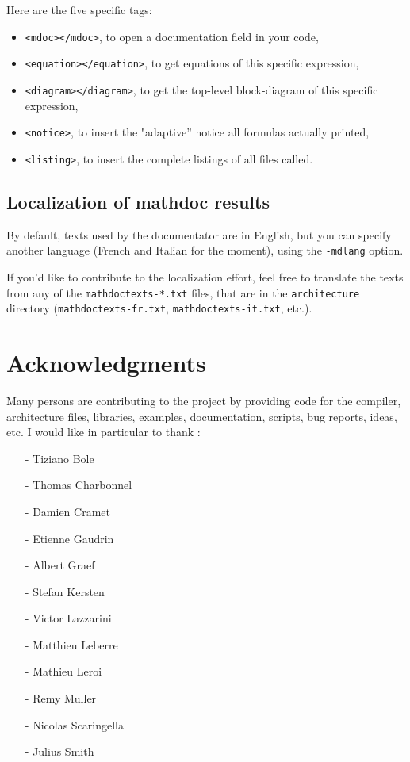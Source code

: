 \documentclass[a4paper]{book}
\begin{document}
Here are the five specific tags:
\begin{itemize}
\item \lstinline!<mdoc></mdoc>!, to open a documentation field in your \faust code,
\item \lstinline!<equation></equation>!, to get equations of this specific \faust expression,
\item \lstinline!<diagram></diagram>!, to get the top-level block-diagram of this specific \faust expression,
\item \lstinline!<notice>!, to insert the "adaptive'' notice all formulas actually printed,
\item \lstinline!<listing>!, to insert the complete listings of all \faust files called.
\end{itemize}


\section{Localization of mathdoc results}
\label{sec:localization-mdoc}

By default, texts used by the documentator are in English, but you can specify another language (French and Italian for the moment), using the \lstinline!-mdlang! option.

If you'd like to contribute to the localization effort, feel free to translate the texts from any of the \lstinline!mathdoctexts-*.txt! files, that are in the \lstinline!architecture! directory (\lstinline!mathdoctexts-fr.txt!, \lstinline!mathdoctexts-it.txt!, etc.).


\chapter{Acknowledgments}
Many persons are contributing to the \faust project by providing code for the compiler, architecture files, libraries, examples, documentation, scripts, bug reports, ideas, etc. I would like in particular to thank :

\begin{itemize}
\item[-]Tiziano Bole	
\item[-]Thomas Charbonnel
\item[-]Damien Cramet
\item[-]Etienne Gaudrin
\item[-]Albert Graef
\item[-]Stefan Kersten
\item[-]Victor Lazzarini
\item[-]Matthieu Leberre
\item[-]Mathieu Leroi
\item[-]Remy Muller
\item[-]Nicolas Scaringella
\item[-]Julius Smith
\end{itemize}
\end{document}
